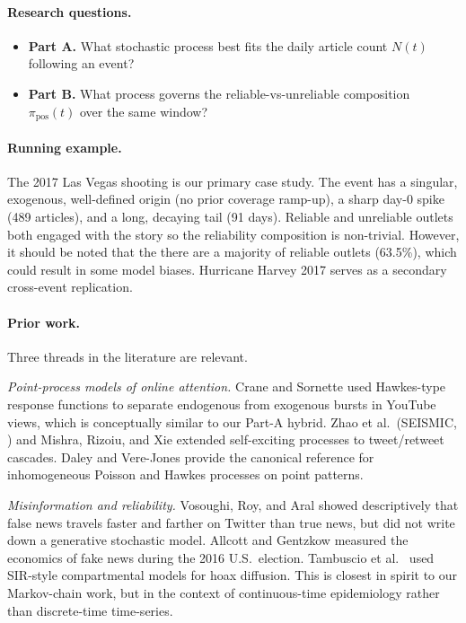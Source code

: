 \documentclass[11pt]{article}
\newcommand{\pipos}{\pi_{\mathrm{pos}}}
\begin{document}
\paragraph{Research questions.}
\begin{itemize}
  \item \textbf{Part A.} What stochastic process best fits the daily article
        count $N(t)$ following an event?
  \item \textbf{Part B.} What process governs the reliable-vs-unreliable
        composition $\pipos(t)$ over the same window?
\end{itemize}

\paragraph{Running example.} The 2017 Las Vegas shooting is our primary case
study. The event has a singular, exogenous, well-defined origin (no prior
coverage ramp-up), a sharp day-0 spike (489 articles), and a long, decaying
tail (91 days). Reliable and unreliable outlets both engaged with the story so the
reliability composition is non-trivial. However, it should be noted that the there
are a majority of reliable outlets (63.5\%), which could result in some model biases. 
Hurricane Harvey 2017 serves as a secondary cross-event replication.

\paragraph{Prior work.} Three threads in the literature are relevant.

\emph{Point-process models of online attention.} Crane and Sornette
\cite{CraneSornette2008} used Hawkes-type response functions to separate
endogenous from exogenous bursts in YouTube views, which is conceptually
similar to our Part-A hybrid. Zhao et al.\ (SEISMIC, \cite{Zhao2015SEISMIC})
and Mishra, Rizoiu, and Xie \cite{MishraRizoiuXie2016} extended self-exciting
processes to tweet/retweet cascades. Daley and Vere-Jones
\cite{DaleyVereJones2003} provide the canonical reference for inhomogeneous
Poisson and Hawkes processes on point patterns.

\emph{Misinformation and reliability.} Vosoughi, Roy, and Aral
\cite{VosoughiRoyAral2018} showed descriptively that false news travels faster
and farther on Twitter than true news, but did not write down a generative
stochastic model. Allcott and Gentzkow \cite{AllcottGentzkow2017} measured the
economics of fake news during the 2016 U.S.\ election. Tambuscio et al.\
\cite{Tambuscio2015} used SIR-style compartmental models for hoax diffusion.
This is closest in spirit to our Markov-chain work, but in the context of continuous-time
epidemiology rather than discrete-time time-series.
\end{document}
